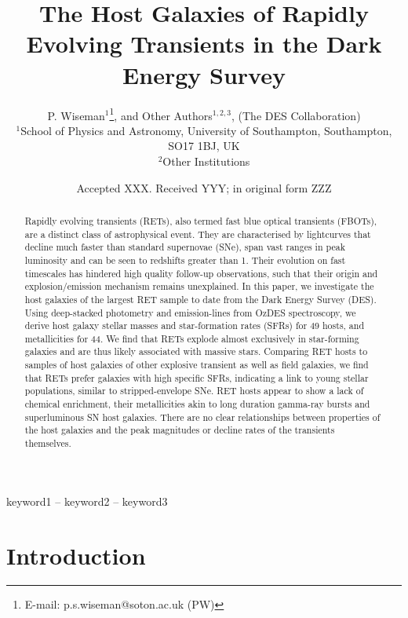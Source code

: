 \documentclass[fleqn,usenatbib,]{mnras}
\title[RET host galaxies in DES]{The Host Galaxies of Rapidly Evolving Transients in the Dark Energy Survey}
\author[P. Wiseman et al.]{
P. Wiseman$^1$\thanks{E-mail: p.s.wiseman@soton.ac.uk (PW)},
 and Other Authors$^{1,2,3}$,
\newauthor
(The DES Collaboration)
\\
$^{1}$School of Physics and Astronomy, University of Southampton, Southampton, SO17 1BJ, UK\\
$^{2}$Other Institutions\\
}
\date{Accepted XXX. Received YYY; in original form ZZZ}
\begin{document}
\label{firstpage}
\pagerange{\pageref{firstpage}--\pageref{lastpage}}
\maketitle

\begin{abstract}
Rapidly evolving transients (RETs), also termed fast blue optical transients (FBOTs), are a distinct class of astrophysical event. They are characterised by lightcurves that decline much faster than standard supernovae (SNe), span vast ranges in peak luminosity and can be seen to redshifts greater than 1. Their evolution on fast timescales has hindered high quality follow-up observations, such that their origin and explosion/emission mechanism remains unexplained. In this paper, we investigate the host galaxies of the largest RET sample to date from the Dark Energy Survey (DES). Using deep-stacked photometry and emission-lines from OzDES spectroscopy, we derive host galaxy stellar masses and star-formation rates (SFRs) for 49 hosts, and metallicities for 44. We find that RETs explode almost exclusively in star-forming galaxies and are thus likely associated with massive stars. Comparing RET hosts to samples of host galaxies of other explosive transient as well as field galaxies, we find that RETs prefer galaxies with high specific SFRs, indicating a link to young stellar populations, similar to stripped-envelope SNe. RET hosts appear to show a lack of chemical enrichment, their metallicities akin to long duration gamma-ray bursts and superluminous SN host galaxies. There are no clear relationships between properties of the host galaxies and the peak magnitudes or decline rates of the transients themselves.

\end{abstract}

\begin{keywords}
keyword1 -- keyword2 -- keyword3
\end{keywords}



\section{Introduction}
\end{document}
